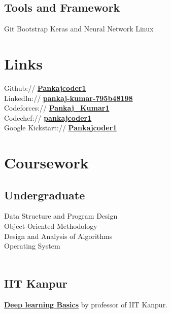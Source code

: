 \documentclass[]{deedy-resume-openfont}
\begin{document}
\begin{minipage}[t]{0.33\textwidth}
\subsection{Tools and Framework}
\textbullet{} Git \textbullet{} Bootstrap \textbullet{} Keras and Neural Network \textbullet{} Linux

\sectionsep


\section{Links} 
Github:// \href{https://github.com/Pankajcoder1}{\bf Pankajcoder1} \\
LinkedIn://  \href{https://www.linkedin.com/in/pankaj-kumar-795b48198/}{\bf pankaj-kumar-795b48198} \\
Codeforces://  \href{https://codeforces.com/profile/Pankaj_Kumar1}{\bf Pankaj\_Kumar1} \\
Codechef://  \href{https://www.codechef.com/users/pankajcoder1}{\bf pankajcoder1} \\
Google Kickstart://  \href{https://codingcompetitions.withgoogle.com/kickstart/certificate/summary/000000000019ffc6}{\bf Pankajcoder1}

\sectionsep


\section{Coursework}
\subsection{Undergraduate}
Data Structure and Program Design \\
Object-Oriented Methodology \\
Design and Analysis of Algorithms \\
Operating System \\
\textit{\\}

\subsection{IIT Kanpur}
\textbullet{} \textbf{\href{https://drive.google.com/file/d/1d9x5mGOKY09LNelg3nZPYIIw90lQtBqH/view?usp=sharing}{Deep learning Basics}} by professor of IIT Kanpur.
\sectionsep


\end{minipage}
\end{document}
